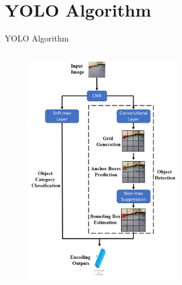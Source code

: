 \documentclass[10pt]{beamer}
\begin{document}


\section{YOLO Algorithm}

\begin{frame}{YOLO Algorithm}
\begin{columns}
\begin{figure}
    \centering
    \includegraphics[width=0.78\textwidth]{Images/YOLO.png}
\end{figure}
\begin{figure}
    \centering

\end{figure}
\end{columns}
\end{frame}
\end{document}
